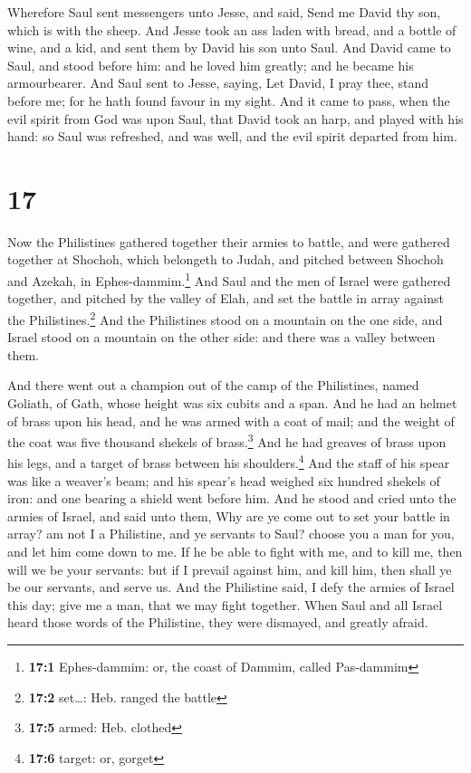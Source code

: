  Wherefore Saul sent messengers unto Jesse, and said,
Send me David thy son, which is with the sheep.  And
Jesse took an ass laden with bread, and a bottle of wine, and a kid, and
sent them by David his son unto Saul.  And David came to
Saul, and stood before him: and he loved him greatly; and he became his
armourbearer.  And Saul sent to Jesse, saying, Let David,
I pray thee, stand before me; for he hath found favour in my sight.
 And it came to pass, when the evil spirit from God was
upon Saul, that David took an harp, and played with his hand: so Saul
was refreshed, and was well, and the evil spirit departed from him.

\hypertarget{section-16}{%
\section{17}\label{section-16}}

 Now the Philistines gathered together their armies to
battle, and were gathered together at Shochoh, which belongeth to Judah,
and pitched between Shochoh and Azekah, in Ephes-dammim.\footnote{\textbf{17:1}
  Ephes-dammim: or, the coast of Dammim, called Pas-dammim}
 And Saul and the men of Israel were gathered together,
and pitched by the valley of Elah, and set the battle in array against
the Philistines.\footnote{\textbf{17:2} set\ldots: Heb. ranged the
  battle}  And the Philistines stood on a mountain on the
one side, and Israel stood on a mountain on the other side: and there
was a valley between them.

 And there went out a champion out of the camp of the
Philistines, named Goliath, of Gath, whose height was six cubits and a
span.  And he had an helmet of brass upon his head, and he
was armed with a coat of mail; and the weight of the coat was five
thousand shekels of brass.\footnote{\textbf{17:5} armed: Heb. clothed}
 And he had greaves of brass upon his legs, and a target
of brass between his shoulders.\footnote{\textbf{17:6} target: or,
  gorget}  And the staff of his spear was like a weaver's
beam; and his spear's head weighed six hundred shekels of iron: and one
bearing a shield went before him.  And he stood and cried
unto the armies of Israel, and said unto them, Why are ye come out to
set your battle in array? am not I a Philistine, and ye servants to
Saul? choose you a man for you, and let him come down to me.
 If he be able to fight with me, and to kill me, then will
we be your servants: but if I prevail against him, and kill him, then
shall ye be our servants, and serve us.  And the
Philistine said, I defy the armies of Israel this day; give me a man,
that we may fight together.  When Saul and all Israel
heard those words of the Philistine, they were dismayed, and greatly
afraid.

